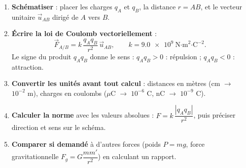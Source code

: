 \documentclass[11pt]{article}
\begin{document}
\begin{methode}
\begin{enumerate}
\item \textbf{Schématiser} : placer les charges $q_A$ et $q_B$, la distance $r = AB$, et le vecteur unitaire $\vec{u}_{AB}$ dirigé de $A$ vers $B$.
\item \textbf{Écrire la loi de Coulomb vectoriellement} :
\[
\vec{F}_{A/B} = k\,\frac{q_A q_B}{r^2}\,\vec{u}_{AB}, \qquad k = \num{9,0e9}\ \text{N·m}^2\text{·C}^{-2}.
\]
Le signe du produit $q_A q_B$ donne le sens : $q_A q_B > 0$ : répulsion ; $q_A q_B < 0$ : attraction.
\item \textbf{Convertir les unités avant tout calcul} : distances en mètres (cm $\to$ $10^{-2}$ m), charges en coulombs ($\mu$C $\to$ $10^{-6}$ C, nC $\to$ $10^{-9}$ C).
\item \textbf{Calculer la norme} avec les valeurs absolues : $F = k\,\dfrac{|q_A q_B|}{r^2}$, puis préciser direction et sens sur le schéma.
\item \textbf{Comparer si demandé} à d'autres forces (poids $P = mg$, force gravitationnelle $F_g = G\dfrac{mm'}{r^2}$) en calculant un rapport.
\end{enumerate}
\end{methode}
\end{document}
